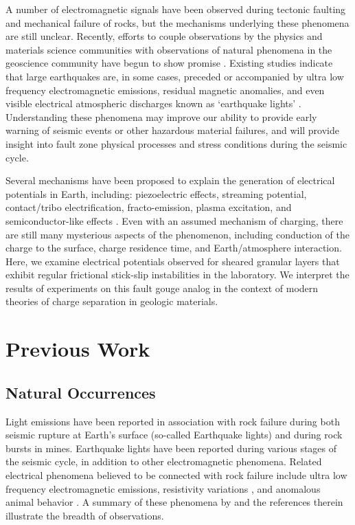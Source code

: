 A number of electromagnetic signals have been observed during tectonic faulting and mechanical failure of rocks, but the mechanisms underlying these phenomena are still unclear.  Recently, efforts to couple observations by the physics and materials science communities with observations of natural phenomena in the geoscience community have begun to show promise \citep{YujiEnomoto:2007tq,Balk:2009hu,Takeuchi:2010kc,Freund:2010bl,Onuma:2011ii,Shinbrot:2012jd}.  Existing studies indicate that large earthquakes are, in some cases, preceded or accompanied by ultra low frequency electromagnetic emissions, residual magnetic anomalies, and even visible electrical atmospheric discharges known as `earthquake lights' \citep{Derr:1973tq, Park:1993vi, Uyeda:2009du}.  Understanding these phenomena may improve our ability to provide early warning of seismic events or other hazardous material failures, and will provide insight into fault zone physical processes and stress conditions during the seismic cycle.  

Several mechanisms have been proposed to explain the generation of electrical potentials in Earth, including: piezoelectric effects, streaming potential, contact/tribo electrification, fracto-emission, plasma excitation, and semiconductor-like effects \citep{Finkelstein:1973vz,Dickinson:1982hx,Dickinson:1982uy,Dickinson:1984ft,Freund:2000vf, Frid:2000vn, Jouniaux:2013da,Takeuchi:2013cu}.  Even with an assumed mechanism of charging, there are still many mysterious aspects of the phenomenon, including conduction of the charge to the surface, charge residence time, and Earth/atmosphere interaction. Here, we examine electrical potentials observed for sheared granular layers that exhibit regular frictional stick-slip instabilities in the laboratory.  We interpret the results of experiments on this fault gouge analog in the context of modern theories of charge separation in geologic materials. 

%
%

\section{Previous Work}

\subsection{Natural Occurrences}
Light emissions have been reported in association with rock failure during both seismic rupture at Earth's surface (so-called Earthquake lights) and during rock bursts in mines.  Earthquake lights have been reported during various stages of the seismic cycle, in addition to other electromagnetic phenomena.  Related electrical phenomena believed to be connected with rock failure include ultra low frequency electromagnetic emissions, resistivity variations \citep{Park:1993vi}, and anomalous animal behavior \citep{Kirschvink:2000wu}.  A summary of these phenomena by\citet{Uyeda:2009du} and the references therein illustrate the breadth of observations.

